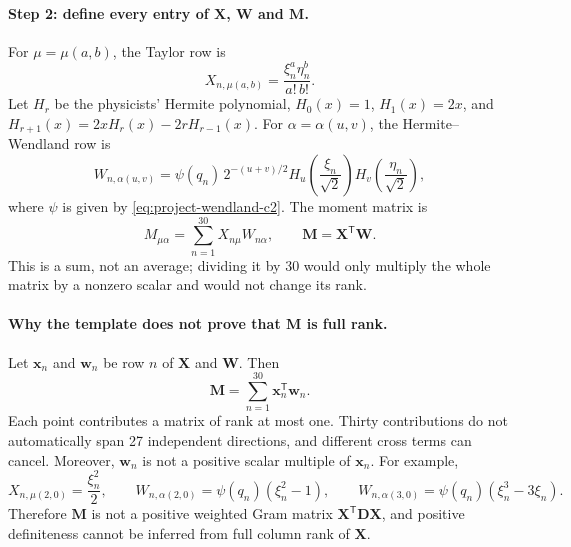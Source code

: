 \documentclass[11pt,a4paper]{article}
\begin{document}
\paragraph{Step 2: define every entry of $\bm X$, $\bm W$ and $\bm M$.}
For $\mu=\mu(a,b)$, the Taylor row is
\begin{equation}
 X_{n,\mu(a,b)}=\frac{\xi_n^a\eta_n^b}{a!\,b!}.
\label{eq:project-X-entry}
\end{equation}
Let $H_r$ be the physicists' Hermite polynomial,
$H_0(x)=1$, $H_1(x)=2x$, and
$H_{r+1}(x)=2xH_r(x)-2rH_{r-1}(x)$. For
$\alpha=\alpha(u,v)$, the Hermite--Wendland row is
\begin{equation}
 W_{n,\alpha(u,v)}
 =\psi(q_n)\,2^{-(u+v)/2}
 H_u\!\left(\frac{\xi_n}{\sqrt2}\right)
 H_v\!\left(\frac{\eta_n}{\sqrt2}\right),
\label{eq:project-W-entry}
\end{equation}
where $\psi$ is given by \eqref{eq:project-wendland-c2}. The moment matrix is
\begin{equation}
 M_{\mu\alpha}
 =\sum_{n=1}^{30}X_{n\mu}W_{n\alpha},
 \qquad \bm M=\bm X^{\mathsf T}\bm W.
\label{eq:cross-moment-entry}
\end{equation}
This is a sum, not an average; dividing it by 30 would only multiply the whole matrix by a
nonzero scalar and would not change its rank.

\paragraph{Why the template does not prove that $\bm M$ is full rank.}
Let $\bm x_n$ and $\bm w_n$ be row $n$ of $\bm X$ and $\bm W$. Then
\begin{equation}
 \bm M=\sum_{n=1}^{30}\bm x_n^{\mathsf T}\bm w_n.
\label{eq:rank-one-sum}
\end{equation}
Each point contributes a matrix of rank at most one. Thirty contributions do not
automatically span 27 independent directions, and different cross terms can cancel.
Moreover, $\bm w_n$ is not a positive scalar multiple of $\bm x_n$. For example,
\begin{equation}
 X_{n,\mu(2,0)}=\frac{\xi_n^2}{2},\qquad
 W_{n,\alpha(2,0)}=\psi(q_n)(\xi_n^2-1),\qquad
 W_{n,\alpha(3,0)}=\psi(q_n)(\xi_n^3-3\xi_n).
\label{eq:hermite-not-proportional}
\end{equation}
Therefore $\bm M$ is not a positive weighted Gram matrix
$\bm X^{\mathsf T}\bm D\bm X$, and positive definiteness cannot be inferred from
full column rank of $\bm X$.
\end{document}
